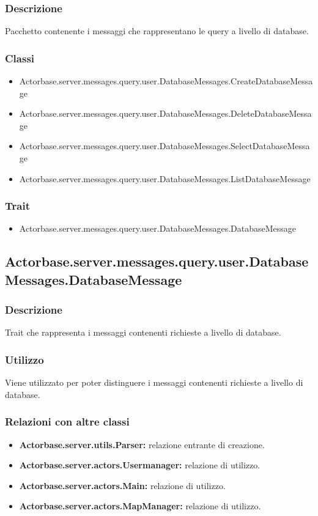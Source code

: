 \documentclass[a4paper]{article}
\begin{document}
			\subsubsection{Descrizione}
				Pacchetto contenente i messaggi che rappresentano le query a livello di database.				
				
			\subsubsection{Classi}
				\begin{itemize}
					\item Actorbase.server.messages.query.user.DatabaseMessages.CreateDatabaseMessage
					\item Actorbase.server.messages.query.user.DatabaseMessages.DeleteDatabaseMessage
					\item Actorbase.server.messages.query.user.DatabaseMessages.SelectDatabaseMessage
					\item Actorbase.server.messages.query.user.DatabaseMessages.ListDatabaseMessage
				\end{itemize}
				
			\subsubsection{Trait}
				\begin{itemize}
					\item Actorbase.server.messages.query.user.DatabaseMessages.DatabaseMessage
				\end{itemize}
				
		\subsection{Actorbase.server.messages.query.user.DatabaseMessages.DatabaseMessage}
			\subsubsection{Descrizione}
				Trait che rappresenta i messaggi contenenti richieste a livello di database.
				
			\subsubsection{Utilizzo}
				Viene utilizzato per poter distinguere i messaggi contenenti richieste a livello di database.
				
			\subsubsection{Relazioni con altre classi}
				\begin{itemize}
					\item \textbf{Actorbase.server.utils.Parser:} relazione entrante di creazione.
					\item \textbf{Actorbase.server.actors.Usermanager:} relazione di utilizzo.
					\item \textbf{Actorbase.server.actors.Main:} relazione di utilizzo.
					\item \textbf{Actorbase.server.actors.MapManager:} relazione di utilizzo.
				\end{itemize}
\end{document}
